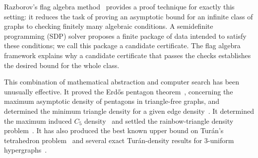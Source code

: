 \documentclass{article}
\begin{document}
Razborov's flag algebra method~\cite{razborov2007flag} provides a proof technique
for exactly this setting: it reduces the task of proving an asymptotic bound
for an infinite class of graphs to checking finitely many algebraic conditions.
A semidefinite programming (SDP) solver proposes a finite package of data
intended to satisfy these conditions; we call this package a candidate
certificate.  The flag algebra
framework explains why a candidate certificate that passes the checks
establishes the desired bound for the whole class.

This combination of mathematical abstraction and computer search has been
unusually effective.  It proved the Erd\H{o}s pentagon
theorem~\cite{hatami2012,grzesik2012}, concerning the maximum asymptotic
density of pentagons in triangle-free graphs, and determined the minimum
triangle density for a given edge density~\cite{razborov2008triangles}.  It
determined the maximum induced $C_5$ density~\cite{balogh2016induced5} and
settled the rainbow-triangle density problem~\cite{balogh2017rainbow}.  It has
also produced the best known upper bound on Tur\'an's tetrahedron
problem~\cite{razborov2010tetrahedron} and several exact
Tur\'an-density results for 3-uniform hypergraphs~\cite{baber2012turan}.
\end{document}
